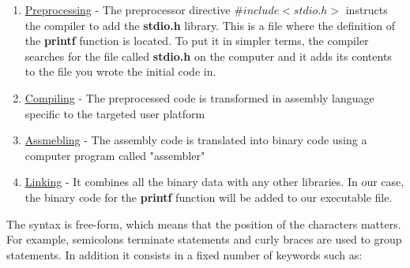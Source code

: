 \documentclass[12pt]{article}
\begin{document}
\begin{enumerate}
    \item \underline{Preprocessing} - The preprocessor directive \textbf{$\#include <stdio.h>$} instructs the compiler to add the \textbf{stdio.h} library. This is a file where the definition of the \textbf{printf} function is located. To put it in simpler terms, the compiler searches for the file called \textbf{stdio.h} on the computer and it adds its contents to the file you wrote the initial code in. 
    
    \item \underline{Compiling} - The preprocessed code is transformed in assembly language specific to the targeted user platform

    \item \underline{Assmebling} - The assembly code is translated into binary code using a computer program called "assembler"

    \item \underline{Linking} - It combines all the binary data with any other libraries. In our case, the binary code for the \textbf{printf} function will be added to our executable file.
\end{enumerate}
The syntax is free-form, which means that the position of the characters matters. For example, semicolons terminate statements and curly braces are used to group statements. In addition it consists in a fixed number of keywords such as:
\end{document}

